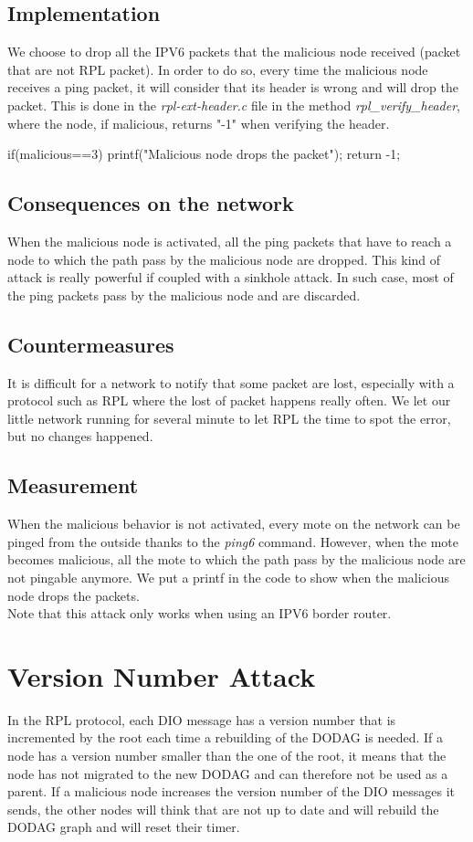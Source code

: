 \documentclass{report}
\begin{document}
\subsection*{Implementation}
We choose to drop all the IPV6 packets that the malicious node received
(packet that are not RPL packet). In order to do so, every time the
malicious node receives a ping packet, it will consider that its header
is wrong and will drop the packet. This is done in the
\textit{rpl-ext-header.c} file in the method
\textit{rpl\_verify\_header}, where the node, if malicious, returns "-1"
when verifying the header.  
\begin{myc}
if(malicious==3){
	printf("Malicious node drops the packet\n");
	return -1;
}	
\end{myc}

\subsection*{Consequences on the network}
When the malicious node is activated, all the ping packets that have to
reach a node to which the path pass by the malicious node are dropped.
This kind of attack is really powerful if coupled with a sinkhole
attack. In such case, most of the ping packets pass by the malicious
node and are discarded. 

\subsection*{Countermeasures}
It is difficult for a network to notify that some packet are lost,
especially with a protocol such as RPL where the lost of packet happens
really often. We let our little network running for several minute to
let RPL the time to spot the error, but no changes happened.

\subsection*{Measurement }
When the malicious behavior is not activated, every mote on the network
can be pinged from the outside thanks to the \textit{ping6} command.
However, when the mote becomes malicious, all the mote to which the path
pass by the malicious node are not pingable anymore. We put a printf in
the code to show when the malicious node drops the packets.\\ 
Note that this attack only works when using an IPV6 border router.

\section{Version Number Attack}
In the RPL protocol, each DIO message has a version number that is
incremented by the root each time a rebuilding of the DODAG is needed.
If a node has a version number smaller than the one of the root, it
means that the node has not migrated to the new DODAG and can therefore
not be used as a parent. If a malicious node increases the version
number of the DIO messages it sends, the other nodes will think that are
not up to date and will rebuild the DODAG graph and will reset their
timer.
\end{document}
